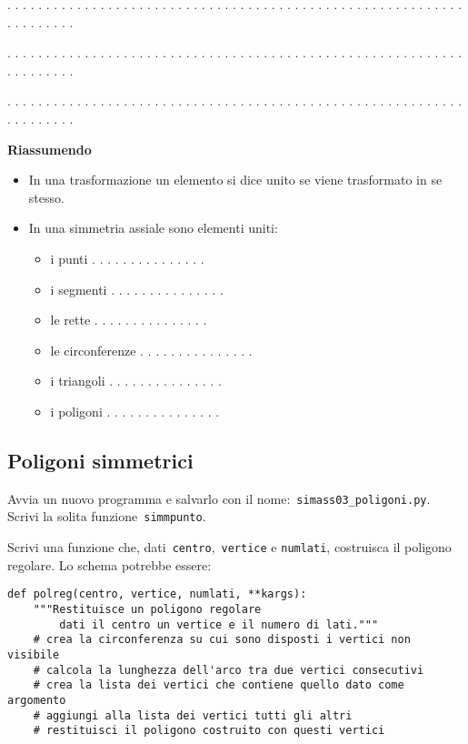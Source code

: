 . . . . . . . . . . . . . . . . . . . . . . . . . . . . . . . . . . . . . . . .
. . . . . . . . . . . . . . . . . . . . . . . . . . . .

. . . . . . . . . . . . . . . . . . . . . . . . . . . . . . . . . . . . . . . .
. . . . . . . . . . . . . . . . . . . . . . . . . . . .

. . . . . . . . . . . . . . . . . . . . . . . . . . . . . . . . . . . . . . . .
. . . . . . . . . . . . . . . . . . . . . . . . . . . .

\textbf{Riassumendo}

\begin{itemize} [noitemsep]
\item In una trasformazione un elemento si dice unito se viene trasformato in se
stesso.
\item In una simmetria assiale sono elementi uniti:
\begin{itemize} [noitemsep]
\item i punti . . . . . . . . . . . . . . .
\item i segmenti . . . . . . . . . . . . . . .
\item le rette . . . . . . . . . . . . . . .
\item le circonferenze . . . . . . . . . . . . . . .
\item i triangoli . . . . . . . . . . . . . . .
\item i poligoni . . . . . . . . . . . . . . .
\end{itemize}
\end{itemize}


\subsection{Poligoni simmetrici}

Avvia un nuovo programma e salvarlo con il 
nome:~\lstinline{simass03_poligoni.py}.
Scrivi la solita funzione~\lstinline{simmpunto}.

Scrivi una funzione che, dati~\lstinline{centro},~\lstinline{vertice} e 
\texttt{numlati},
costruisca il poligono regolare. Lo schema potrebbe essere:

\begin{lstlisting}
def polreg(centro, vertice, numlati, **kargs):
    """Restituisce un poligono regolare 
        dati il centro un vertice e il numero di lati."""
    # crea la circonferenza su cui sono disposti i vertici non visibile
    # calcola la lunghezza dell'arco tra due vertici consecutivi
    # crea la lista dei vertici che contiene quello dato come argomento
    # aggiungi alla lista dei vertici tutti gli altri
    # restituisci il poligono costruito con questi vertici
\end{lstlisting}

